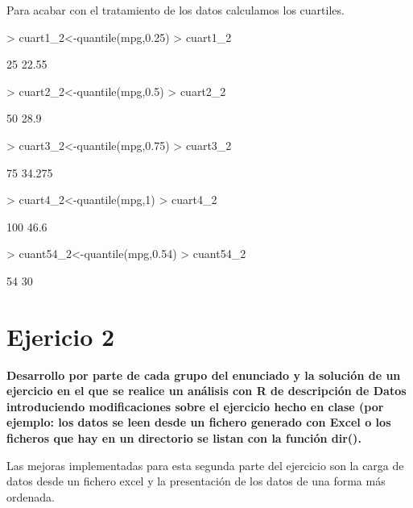 \documentclass[a4paper]{article}
\begin{document}
Para acabar con el tratamiento de los datos calculamos los cuartiles.
\begin{Schunk}
\begin{Sinput}
> cuart1_2<-quantile(mpg,0.25)
> cuart1_2
\end{Sinput}
\begin{Soutput}
  25% 
22.55 
\end{Soutput}
\begin{Sinput}
> cuart2_2<-quantile(mpg,0.5)
> cuart2_2
\end{Sinput}
\begin{Soutput}
 50% 
28.9 
\end{Soutput}
\begin{Sinput}
> cuart3_2<-quantile(mpg,0.75)
> cuart3_2
\end{Sinput}
\begin{Soutput}
   75% 
34.275 
\end{Soutput}
\begin{Sinput}
> cuart4_2<-quantile(mpg,1)
> cuart4_2
\end{Sinput}
\begin{Soutput}
100% 
46.6 
\end{Soutput}
\begin{Sinput}
> cuant54_2<-quantile(mpg,0.54)
> cuant54_2
\end{Sinput}
\begin{Soutput}
54% 
 30 
\end{Soutput}
\end{Schunk}


\section{Ejericio 2}
\textbf{Desarrollo por parte de cada grupo del enunciado y la solución de un ejercicio en el que se realice un análisis con R de descripción de Datos introduciendo modificaciones sobre el ejercicio hecho en clase (por ejemplo: los datos se leen desde un fichero generado con Excel o los ficheros que hay en un directorio se listan con la función dir().}

Las mejoras implementadas para esta segunda parte del ejercicio son la carga de datos desde un fichero excel y la presentación de los datos de una forma más ordenada.
\end{document}
